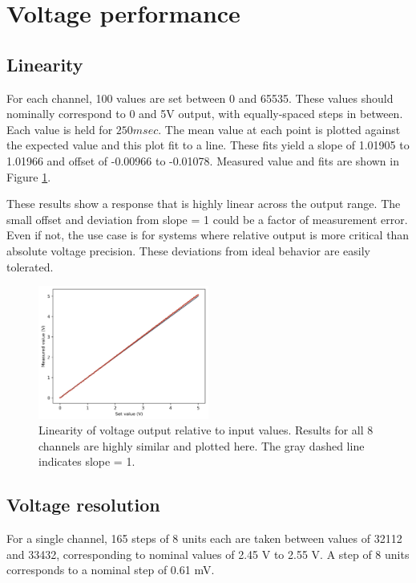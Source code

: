 \documentclass[10pt,a4paper]{article}
\begin{document}
\section{Voltage performance}
\subsection{Linearity}

For each channel, 100 values are set between 0 and 65535.  These values should nominally correspond to 0 and 5V output, with equally-spaced steps in between.  Each value is held for $250 msec$.  The mean value at each point is plotted against the expected value and this plot fit to a line.  These fits yield a slope of 1.01905 to 1.01966 and offset of -0.00966 to -0.01078.  Measured value and fits are shown in Figure \ref{fig:linearity}.

These results show a response that is highly linear across the output range.  The small offset and deviation from slope = 1 could be a factor of measurement error.  Even if not, the use case is for systems where relative output is more critical than absolute voltage precision.  These deviations from ideal behavior are easily tolerated.  

\begin{figure}
	\centering
	\includegraphics[width=0.5\textwidth]{../output/linearityPlots.png}
	\caption[linearity]{Linearity of voltage output relative to input values. Results for all 8 channels are highly similar and plotted here.  The gray dashed line indicates slope = 1.\newline}
	\label{fig:linearity}
\end{figure} 

\subsection{Voltage resolution}

For a single channel, 165 steps of 8 units each are taken between values of 32112 and 33432, corresponding to nominal values of 2.45 V to 2.55 V. A step of 8 units corresponds to a nominal step of 0.61 mV.
\end{document}
